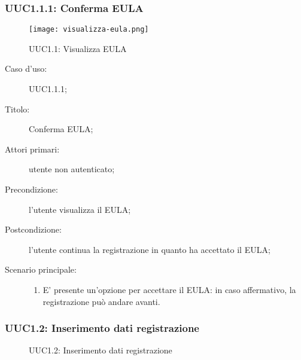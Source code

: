 \documentclass[../../../analisi-dei-requisiti.tex]{subfiles}
\begin{document}
\subsubsection{UUC1.1.1: Conferma EULA}%
\label{subs:UUC1.1.1}

\begin{figure}[H]
  \centering
  \texttt{[image: visualizza-eula.png]}
  \caption{UUC1.1: Visualizza EULA}%
  \label{fig:uuc1.1}
\end{figure}


\begin{description}
  \item[Caso d’uso:] UUC1.1.1;
  \item[Titolo:] Conferma EULA;
  \item[Attori primari:] utente non autenticato;
  \item[Precondizione:] l'utente visualizza il EULA;
  \item[Postcondizione:] l'utente continua la registrazione in quanto ha accettato il EULA;
  \item[Scenario principale:]
        \begin{enumerate}
          \item E' presente un'opzione per accettare il EULA: in caso affermativo, la registrazione può andare avanti.
        \end{enumerate}
\end{description}

\subsubsection{UUC1.2: Inserimento dati registrazione}%
\label{subs:UUC1.2}

\begin{figure}[H]
  \centering
  \caption{UUC1.2: Inserimento dati registrazione}%
  \label{fig:uuc1_2}
\end{figure}
\end{document}
